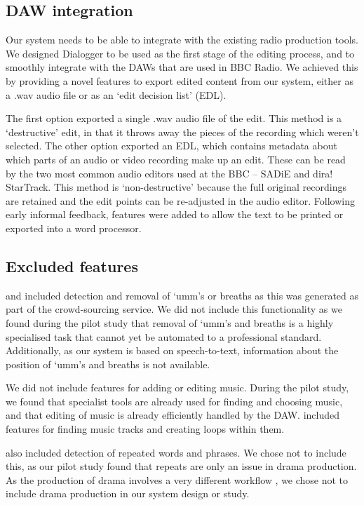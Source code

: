 \subsection{DAW integration}
Our system needs to be able to integrate with the existing radio production
tools. We designed Dialogger to be used as the first stage of the editing
process, and to smoothly integrate with the DAWs that are used in BBC Radio. We
achieved this by providing a novel features to export edited content from our
system, either as a .wav audio file or as an `edit decision list' (EDL).

The first option exported a single .wav audio file of the edit. This method is
a `destructive' edit, in that it throws away the pieces of the recording which
weren't selected. 
The other option exported an EDL, which contains metadata about which parts of
an audio or video recording make up an edit. These can be read by the
two most common audio editors used at the BBC -- SADiE and dira! StarTrack.
This method is `non-destructive' because the full original recordings are
retained and the edit points can be re-adjusted in the audio editor.  Following
early informal feedback, features were added to allow the text to be printed or
exported into a word processor.

\subsection{Excluded features}
\citet{Rubin2013} and \citet{Berthouzoz2012} included detection and removal of
`umm's or breaths as this was generated as part of the crowd-sourcing service.
We did not include this functionality as we found during the pilot study that
removal of `umm's and breaths is a highly specialised task that cannot yet be
automated to a professional standard.  Additionally, as our system is based on
speech-to-text, information about the position of `umm's and breaths is not
available.

We did not include features for adding or editing music. During the pilot study,
we found that specialist tools are already used for finding and choosing music,
and that editing of music is already efficiently handled by the DAW.
\citet{Rubin2013} included features for finding music tracks and creating loops
within them.

\citet{Rubin2013} also included detection of repeated words and phrases. We
chose not to include this, as our pilot study found that repeats are only an
issue in drama production. As the production of drama involves a very different
workflow \citep{Baume2015}, we chose not to include drama production in our
system design or study.

